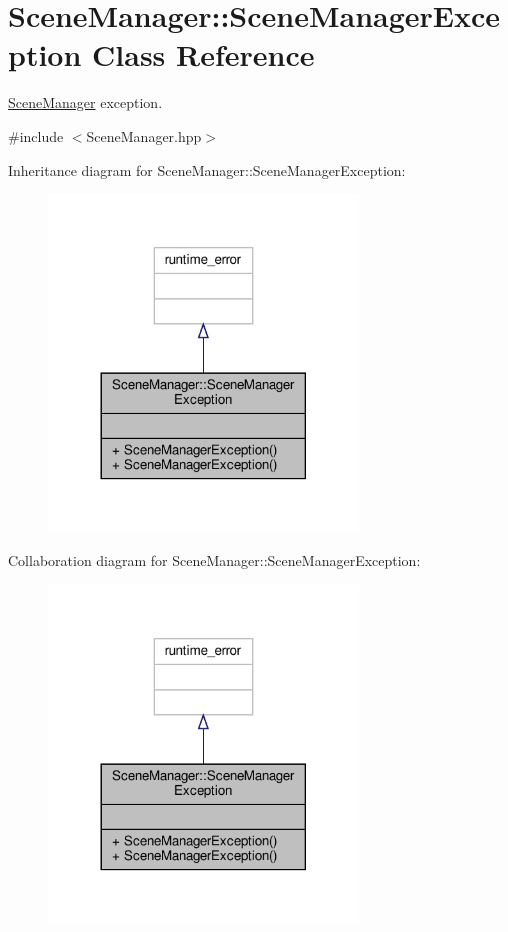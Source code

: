 \hypertarget{class_scene_manager_1_1_scene_manager_exception}{}\section{Scene\+Manager\+:\+:Scene\+Manager\+Exception Class Reference}
\label{class_scene_manager_1_1_scene_manager_exception}


\hyperlink{class_scene_manager}{Scene\+Manager} exception.  




{\ttfamily \#include $<$Scene\+Manager.\+hpp$>$}



Inheritance diagram for Scene\+Manager\+:\+:Scene\+Manager\+Exception\+:
\nopagebreak
\begin{figure}[H]
\begin{center}
\leavevmode
\includegraphics[width=233pt]{class_scene_manager_1_1_scene_manager_exception__inherit__graph}
\end{center}
\end{figure}


Collaboration diagram for Scene\+Manager\+:\+:Scene\+Manager\+Exception\+:
\nopagebreak
\begin{figure}[H]
\begin{center}
\leavevmode
\includegraphics[width=233pt]{class_scene_manager_1_1_scene_manager_exception__coll__graph}
\end{center}
\end{figure}
